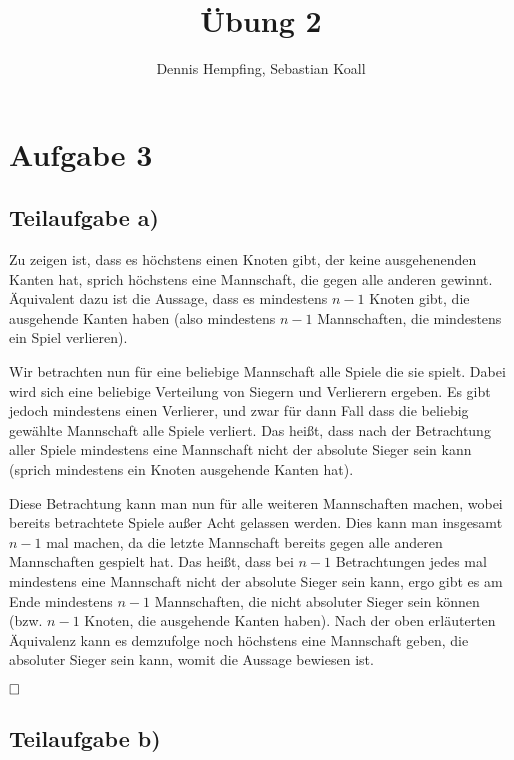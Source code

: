 \documentclass[12pt]{scrartcl}%
\theoremstyle{nonumberplain}
\begin{document}
\author{Dennis Hempfing, Sebastian Koall}
\title{Übung 2}
\date{} 
\pagestyle{myheadings}

\maketitle %
 
\section*{Aufgabe 3}
\subsection*{Teilaufgabe a)}

Zu zeigen ist, dass es höchstens einen Knoten gibt, der keine ausgehenenden Kanten hat, sprich höchstens eine Mannschaft, die gegen alle anderen gewinnt. Äquivalent dazu ist die Aussage, dass es mindestens $n-1$ Knoten gibt, die ausgehende Kanten haben (also mindestens $n-1$ Mannschaften, die mindestens ein Spiel verlieren).

Wir betrachten nun für eine beliebige Mannschaft alle Spiele die sie spielt. Dabei wird sich eine beliebige Verteilung von Siegern und Verlierern ergeben. Es gibt jedoch mindestens einen Verlierer, und zwar für dann Fall dass die beliebig gewählte Mannschaft alle Spiele verliert. Das heißt, dass nach der Betrachtung aller Spiele mindestens eine Mannschaft nicht der absolute Sieger sein kann (sprich mindestens ein Knoten ausgehende Kanten hat).

Diese Betrachtung kann man nun für alle weiteren Mannschaften machen, wobei bereits betrachtete Spiele außer Acht gelassen werden. Dies kann man insgesamt $n-1$ mal machen, da die letzte Mannschaft bereits gegen alle anderen Mannschaften gespielt hat. Das heißt, dass bei $n-1$ Betrachtungen jedes mal mindestens eine Mannschaft nicht der absolute Sieger sein kann, ergo gibt es am Ende mindestens $n-1$ Mannschaften, die nicht absoluter Sieger sein können (bzw. $n-1$ Knoten, die ausgehende Kanten haben). Nach der oben erläuterten Äquivalenz kann es demzufolge noch höchstens eine Mannschaft geben, die absoluter Sieger sein kann, womit die Aussage bewiesen ist.

$\hfill \square$

\subsection*{Teilaufgabe b)}
\end{document}
